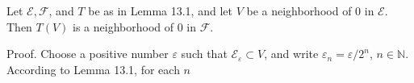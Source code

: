 Let $\mathcal{E}, \mathcal{F}$, and $T$ be as in Lemma 13.1, and let $V$ be a neighborhood of 0 in $\mathcal{E}$. Then $T(V)$ is a neighborhood of 0 in $\mathcal{F}$.

Proof. Choose a positive number $\varepsilon$ such that $\mathcal{E}_{\varepsilon} \subset V$, and write $\varepsilon_n = \varepsilon/2^n$, $n \in \mathbb{N}$. According to Lemma 13.1, for each $n$
